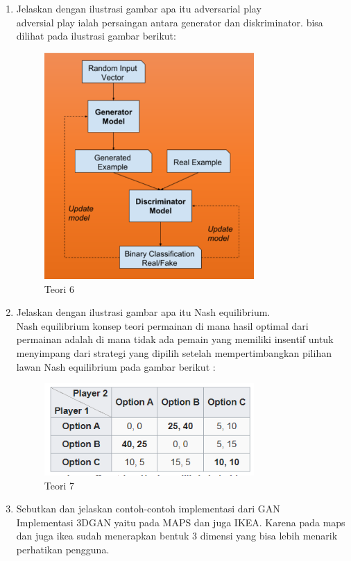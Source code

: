 \begin{enumerate}
\item Jelaskan dengan ilustrasi gambar apa itu adversarial play
	\hfill\\
	adversial play ialah persaingan antara generator dan diskriminator. bisa dilihat pada ilustrasi gambar berikut:
	
\begin{figure}[H]
    \includegraphics[width=8cm]{figures/1174084/8/teori6.png}
    \centering
    \caption{Teori 6}
\end{figure}

\item Jelaskan dengan ilustrasi gambar apa itu Nash equilibrium.
	\hfill\\
	Nash equilibrium konsep teori permainan di mana hasil optimal dari permainan adalah di mana tidak ada pemain yang memiliki insentif untuk menyimpang dari strategi yang dipilih setelah mempertimbangkan pilihan lawan
	Nash equilibrium pada gambar berikut :
		
\begin{figure}[H]
    \includegraphics[width=8cm]{figures/1174084/8/teori7.png}
    \centering
    \caption{Teori 7}
\end{figure}

\item Sebutkan dan jelaskan contoh-contoh implementasi dari GAN
	\hfill\\
	Implementasi 3DGAN yaitu pada MAPS dan juga IKEA. Karena pada maps dan juga ikea sudah menerapkan bentuk 3 dimensi yang bisa lebih menarik perhatikan pengguna.
	

\end{enumerate}
